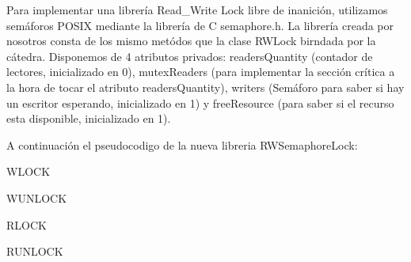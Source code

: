 Para implementar una librería Read_Write Lock libre de inanición, utilizamos semáforos POSIX mediante la librería de C semaphore.h. La librería creada por nosotros consta de los mismo metódos que la clase RWLock birndada por la cátedra. Disponemos de 4 atributos privados: readersQuantity (contador de lectores, inicializado en 0), mutexReaders (para implementar la sección crítica a la hora de tocar el atributo readersQuantity), writers (Semáforo para saber si hay un escritor esperando, inicializado en 1) y freeResource (para saber si el recurso esta disponible, inicializado en 1).

A continuación el pseudocodigo de la nueva libreria RWSemaphoreLock:

WLOCK

WUNLOCK

RLOCK

RUNLOCK
